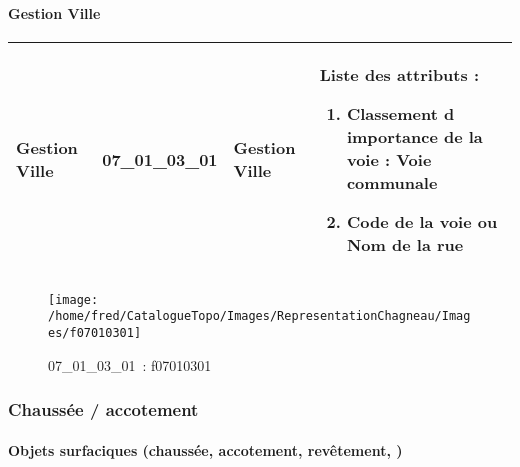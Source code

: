 \documentclass[12pt,titlepage]{book}
\begin{document}
\paragraph{Gestion Ville}
\noindent
\vspace{\baselineskip}

\renewcommand{\arraystretch}{1.2}
\begin{supertabular}{|p{10cm}|c|p{13cm}|p{12cm}|}
 Gestion Ville & 07\_01\_03\_01 & Gestion Ville & Liste des attributs :
\begin{enumerate}
  \item Classement d importance de la voie : Voie communale  \item Code de la voie ou Nom de la rue\end{enumerate}
\\
\hline
\end{supertabular}
\begin{figure}[h!]
  \hfill         %
  \begin{minipage}[t]{3cm}
    \begin{center}
      \texttt{[image: /home/fred/CatalogueTopo/Images/RepresentationChagneau/Images/f07010301]}
      \caption[~07\_01\_03\_01]{\small{07\_01\_03\_01~:} \tiny{f07010301}}\label{f07010301}
    \end{center}
  \end{minipage}
\end{figure}

\subsubsection{\large Chaussée / accotement}
\paragraph{Objets surfaciques (chaussée, accotement, revêtement, )}
\noindent
\vspace{\baselineskip}
\end{document}
